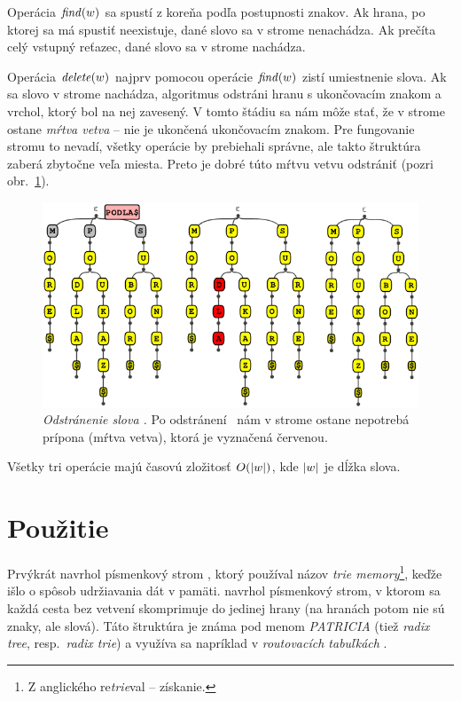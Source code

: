 Operácia $\mathop{\mathit{find}}(w)$ sa spustí z koreňa podľa postupnosti znakov. Ak hrana, 
po ktorej sa má spustiť neexistuje, dané slovo sa v strome nenachádza. 
Ak prečíta celý vstupný reťazec, dané slovo sa v strome nachádza.

Operácia $\mathop{\mathit{delete}}(w)$ najprv pomocou operácie $\mathop{\mathit{find}}(w)$ zistí umiestnenie slova. 
Ak sa slovo v strome nachádza, algoritmus odstráni hranu s ukončovacím 
znakom a vrchol, ktorý bol na nej zavesený. V tomto štádiu sa nám môže 
stať, že v strome ostane \emph{mŕtva vetva} -- nie je ukončená 
ukončovacím znakom. Pre fungovanie stromu to nevadí, všetky operácie by 
prebiehali správne, ale takto štruktúra zaberá zbytočne veľa miesta. 
Preto je dobré túto mŕtvu vetvu odstrániť (pozri obr.~\ref{img:triedelete}).

\begin{figure}
\centering
\includegraphics[width=0.9\columnwidth]{obrazky/triedeletesmall.png}
\caption{\emph{Odstránenie slova .} Po odstránení 
\uz\ nám v strome ostane nepotrebá prípona  (mŕtva vetva), 
ktorá je vyznačená červenou.}
\label{img:triedelete} 
\end{figure}

Všetky tri operácie majú časovú 
zložitosť $O(|w|)$, kde $|w|$ je dĺžka slova.

\section{Použitie}\label{sec:trie:pouzitie}
Prvýkrát navrhol písmenkový strom \citet{fredkin}, ktorý používal názov 
\emph{trie memory}\footnote{Z anglického re\emph{trie}val -- získanie.}, 
keďže išlo o spôsob udržiavania dát v pamäti. 
\citet{patricia} navrhol písmenkový strom, v ktorom sa každá cesta bez vetvení
skomprimuje do jedinej hrany (na hranách potom nie sú znaky, ale slová).
Táto štruktúra je známa pod menom \emph{PATRICIA} (tiež \emph{radix tree},
resp.\ \emph{radix trie}) a využíva sa napríklad v \emph{routovacích tabuľkách}
\citep{radix}.

